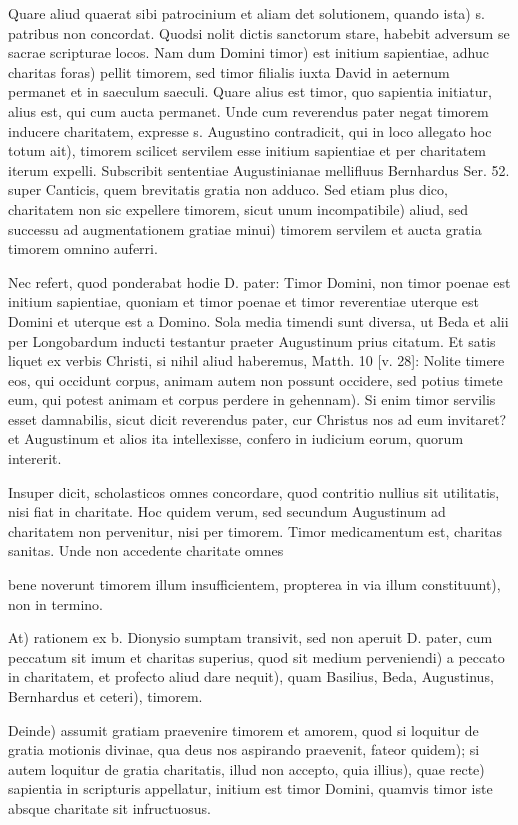Quare aliud quaerat sibi patrocinium et aliam det solutionem, quando ista) s. patribus non concordat. Quodsi nolit dictis sanctorum stare, habebit adversum se sacrae scripturae locos. Nam dum Domini timor) est initium sapientiae, adhuc charitas foras) pellit timorem, sed timor filialis iuxta David in aeternum permanet et in saeculum saeculi. Quare alius est timor, quo sapientia initiatur, alius est, qui cum aucta permanet. Unde cum reverendus pater negat timorem inducere charitatem, expresse s. Augustino contradicit, qui in loco allegato hoc totum ait), timorem scilicet servilem esse initium sapientiae et per charitatem iterum expelli. Subscribit sententiae Augustinianae mellifluus Bernhardus Ser. 52. super Canticis, quem brevitatis gratia non adduco. Sed etiam plus dico, charitatem non sic expellere timorem, sicut \marginpar{\small[367]} unum incompatibile) aliud, sed successu ad augmentationem gratiae minui) timorem servilem et aucta gratia timorem omnino auferri.

Nec refert, quod ponderabat hodie D. pater: Timor Domini, non timor poenae est initium sapientiae, quoniam et timor poenae et timor reverentiae uterque est Domini et uterque est a Domino. Sola media timendi sunt diversa, ut Beda et alii per Longobardum inducti testantur praeter Augustinum prius citatum. Et satis liquet ex verbis Christi, si nihil aliud haberemus, Matth. 10 [v. 28]: Nolite timere eos, qui occidunt corpus, animam autem non possunt occidere, sed potius timete eum, qui potest animam et corpus perdere in gehennam). Si enim timor servilis esset damnabilis, sicut dicit reverendus pater, cur Christus nos ad eum invitaret? et Augustinum et alios ita intellexisse, confero in iudicium eorum, quorum intererit.

Insuper dicit, scholasticos omnes concordare, quod contritio nullius sit utilitatis, nisi fiat in charitate. Hoc quidem verum, sed secundum Augustinum ad charitatem non pervenitur, nisi per timorem. Timor medicamentum est, charitas sanitas. Unde non accedente charitate omnes

bene noverunt timorem illum insufficientem, propterea in via illum constituunt), non in termino.

At) rationem ex b. Dionysio sumptam transivit, sed non aperuit D. pater, cum peccatum sit imum et charitas superius, quod sit medium perveniendi) a peccato in charitatem, et profecto aliud dare nequit), quam Basilius, Beda, Augustinus, Bernhardus et ceteri), timorem.

Deinde) assumit gratiam praevenire timorem et amorem, quod si loquitur de gratia motionis divinae, qua deus nos aspirando praevenit, fateor quidem); si autem loquitur de gratia charitatis, illud non accepto, quia illius), quae recte) sapientia in scripturis appellatur, initium est timor Domini, quamvis timor iste absque charitate sit infructuosus.

